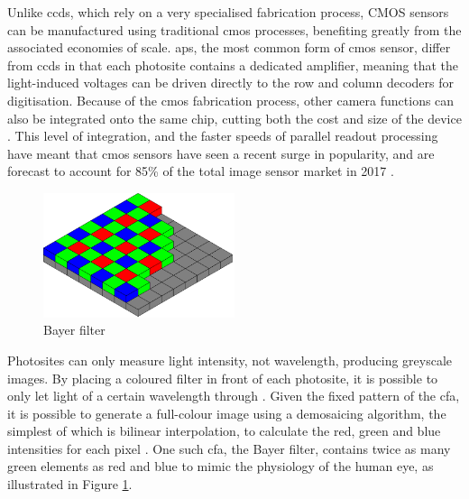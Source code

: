 Unlike \glspl{ccd}, which rely on a very specialised fabrication process, CMOS sensors can be manufactured using traditional \gls{cmos} processes, benefiting greatly from the associated economies of scale. \gls{aps}, the most common form of \gls{cmos} sensor, differ from \glspl{ccd} in that each photosite contains a dedicated amplifier, meaning that the light-induced voltages can be driven directly to the row and column decoders for digitisation. Because of the \gls{cmos} fabrication process, other camera functions can also be integrated onto the same chip, cutting both the cost and size of the device \cite{10_ge_2012}.  This level of integration, and the faster speeds of parallel readout processing have meant that \gls{cmos} sensors have seen a recent surge in popularity, and are forecast to account for 85\% of the total image sensor market in 2017 \cite{11_ic_insights_2013}.

\begin{figure}
  \centering
  \includegraphics[width=0.5\textwidth]{./img/bayer_pattern.png}\par
  \caption{Bayer filter \cite{bayer_filter}}
  \label{fig:bayer_pattern}
\end{figure}

Photosites can only measure light intensity, not wavelength, producing greyscale images. By placing a coloured filter in front of each photosite, it is possible to only let light of a certain wavelength through \cite{12_eastman_kodak_company_1976}. Given the fixed pattern of the \gls{cfa}, it is possible to generate a full-colour image using a demosaicing algorithm, the simplest of which is bilinear interpolation, to calculate the red, green and blue intensities for each pixel \cite{13_malvar_he_cutler_2015}. One such \gls{cfa}, the Bayer filter, contains twice as many green elements as red and blue to mimic the physiology of the human eye, as illustrated in Figure \ref{fig:bayer_pattern}.
